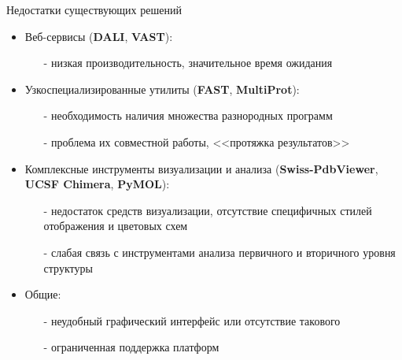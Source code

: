 \documentclass[utf8, professionalfonts]{beamer}
\begin{document}
\begin{frame}{Недостатки существующих решений}
\begin{small}
\begin{itemize}
    \item Веб-сервисы (\textbf{DALI}, \textbf{VAST}): 
    \begin{itemize}
        \item[-] низкая производительность, значительное время ожидания
    \end{itemize}

    \item Узкоспециализированные утилиты (\textbf{FAST}, \textbf{MultiProt}):
    \begin{itemize}
        \item[-] необходимость наличия множества разнородных программ
        \item[-] проблема их совместной работы, <<протяжка результатов>>
    \end{itemize}

    \item Комплексные инструменты визуализации и анализа (\textbf{Swiss-PdbViewer}, \textbf{UCSF Chimera}, \textbf{PyMOL}):
    \begin{itemize}
        \item[-] недостаток средств визуализации, отсутствие специфичных стилей отображения и цветовых схем
        \item[-] слабая связь с инструментами анализа первичного и вторичного уровня структуры
    \end{itemize}

    \item Общие:
    \begin{itemize}
        \item[-] неудобный графический интерфейс или отсутствие такового
        \item[-] ограниченная поддержка платформ
    \end{itemize}

\end{itemize}
\end{small}
\end{frame}
\end{document}
